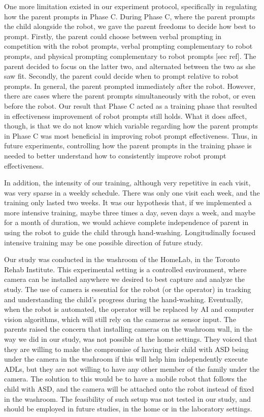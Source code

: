 One more limitation existed in our experiment protocol, specifically in regulating how the parent prompts in Phase C.  During Phase C, where the parent prompts the child alongside the robot, we gave the parent freedoms to decide how best to prompt.  Firstly, the parent could choose between verbal prompting in competition with the robot prompts, verbal prompting complementary to robot prompts, and physical prompting complementary to robot prompts [sec ref].  The parent decided to focus on the latter two, and alternated between the two as she saw fit.  Secondly, the parent could decide when to prompt relative to robot prompts.  In general, the parent prompted immediately after the robot.  However, there are cases where the parent prompts simultaneously with the robot, or even before the robot.  Our result that Phase C acted as a training phase that resulted in effectiveness improvement of robot prompts still holds.  What it does affect, though, is that we do not know which variable regarding how the parent prompts in Phase C was most beneficial in improving robot prompt effectiveness.  Thus, in future experiments, controlling how the parent prompts in the training phase is needed to better understand how to consistently improve robot prompt effectiveness.

In addition, the intensity of our training, although very repetitive in each visit, was very sparse in a weekly schedule.  There was only one visit each week, and the training only lasted two weeks.  It was our hypothesis that, if we implemented a more intensive training, maybe three times a day, seven days a week, and maybe for a month of duration, we would achieve complete independence of parent in using the robot to guide the child through hand-washing.  Longitudinally focused intensive training may be one possible direction of future study.

Our study was conducted in the washroom of the HomeLab, in the Toronto Rehab Institute.  This experimental setting is a controlled environment, where camera can be installed anywhere we desired to best capture and analyze the study.  The use of camera is essential for the robot (or the operator) in tracking and understanding the child's progress during the hand-washing.  Eventually, when the robot is automated, the operator will be replaced by AI and computer vision algorithms, which will still rely on the cameras as sensor input.  The parents raised the concern that installing cameras on the washroom wall, in the way we did in our study, was not possible at the home settings.  They voiced that they are willing to make the compromise of having their child with ASD being under the camera in the washroom if this will help him independently execute ADLs, but they are not willing to have any other member of the family under the camera.  The solution to this would be to have a mobile robot that follows the child with ASD, and the camera will be attached onto the robot instead of fixed in the washroom.  The feasibility of such setup was not tested in our study, and should be employed in future studies, in the home or in the laboratory settings.

